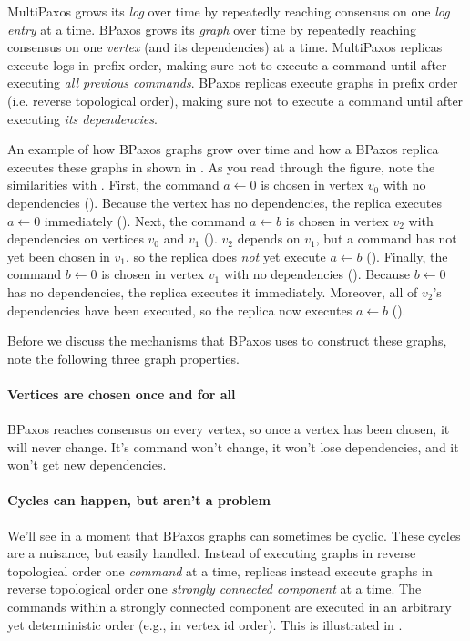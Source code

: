 MultiPaxos grows its \emph{log} over time by repeatedly reaching consensus on
one \emph{log entry} at a time. BPaxos grows its \emph{graph} over time by
repeatedly reaching consensus on one \emph{vertex} (and its dependencies) at a
time. MultiPaxos replicas execute logs in prefix order, making sure not to
execute a command until after executing \emph{all previous commands}. BPaxos
replicas execute graphs in prefix order (i.e. reverse topological order),
making sure not to execute a command until after executing \emph{its
dependencies}.

An example of how BPaxos graphs grow over time and how a BPaxos replica
executes these graphs in shown in . As you read
through the figure, note the similarities with
.
%
First, the command $a \gets 0$ is chosen in vertex $v_0$ with no dependencies
().
%
Because the vertex has no dependencies, the replica executes $a \gets 0$
immediately ().
%
Next, the command $a \gets b$ is chosen in vertex $v_2$ with dependencies on
vertices $v_0$ and $v_1$ ().
%
$v_2$ depends on $v_1$, but a command has not yet been chosen in $v_1$, so the
replica does \emph{not} yet execute $a \gets b$
().
%
Finally, the command $b \gets 0$ is chosen in vertex $v_1$ with no
dependencies ().
%
Because $b \gets 0$ has no dependencies, the replica executes it immediately.
Moreover, all of $v_2$'s dependencies have been executed, so the replica now
executes $a \gets b$ ().

{}

Before we discuss the mechanisms that BPaxos uses to construct these graphs,
note the following three graph properties.

\paragraph{Vertices are chosen once and for all}
BPaxos reaches consensus on every vertex, so once a vertex has been chosen, it
will never change. It's command won't change, it won't lose dependencies,
and it won't get new dependencies.

\paragraph{Cycles can happen, but aren't a problem}
We'll see in a moment that BPaxos graphs can sometimes be cyclic. These cycles
are a nuisance, but easily handled. Instead of executing graphs in reverse
topological order one \emph{command} at a time, replicas instead execute graphs
in reverse topological order one \emph{strongly connected component} at a time.
The commands within a strongly connected component are executed in an arbitrary
yet deterministic order (e.g., in vertex id order). This is illustrated in
.

